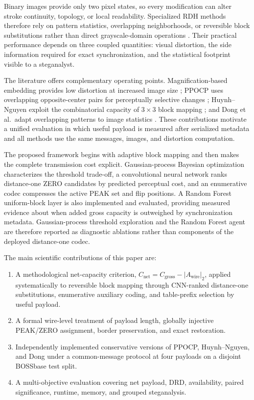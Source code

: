 \documentclass[a4paper,fleqn]{cas-dc}
\begin{document}
Binary images provide only two pixel states, so every modification can alter
stroke continuity, topology, or local readability. Specialized RDH methods
therefore rely on pattern statistics, overlapping neighborhoods, or reversible
block substitutions rather than direct grayscale-domain operations
\cite{Chhajed2023BlockDiagonal,Huynh2025BlockMapping,Yang2023Large,
Ren2022Sliding,Dong2020Adaptive,Zhang2022Magnification,Yin2020PPOCP,
23,Ren2019Encrypted,Feng2015Secure,69}. Their practical performance depends
on three coupled quantities: visual distortion, the side information required
for exact synchronization, and the statistical footprint visible to a
steganalyst.

The literature offers complementary operating points. Magnification-based
embedding provides low distortion at increased image size
\cite{Zhang2022Magnification}; PPOCP
uses overlapping opposite-center pairs for perceptually selective changes
\cite{Yin2020PPOCP}; Huynh--Nguyen exploit the combinatorial capacity of
$3\times3$ block mapping \cite{Huynh2025BlockMapping}; and Dong et al.\ adapt
overlapping patterns to image statistics \cite{Dong2020Adaptive}. These
contributions motivate a unified evaluation in
which useful payload is measured after serialized metadata and all methods use
the same messages, images, and distortion computation.

The proposed framework begins with adaptive block mapping and then makes the
complete transmission cost explicit. Gaussian-process Bayesian optimization
characterizes the threshold trade-off, a convolutional neural network ranks
distance-one ZERO candidates by predicted perceptual cost, and an enumerative
codec compresses the active PEAK set and flip positions. A Random Forest
uniform-block layer is also implemented and evaluated, providing measured
evidence about when added gross capacity is outweighed by synchronization
metadata. Gaussian-process threshold exploration and the Random Forest agent
are therefore reported as diagnostic ablations rather than components of the
deployed distance-one codec.

The main scientific contributions of this paper are:
\begin{enumerate}
    \item A methodological net-capacity criterion,
    $C_{\mathrm{net}}=C_{\mathrm{gross}}-|A_{\mathrm{wire}}|_2$, applied
    systematically to reversible block mapping through CNN-ranked
    distance-one substitutions, enumerative auxiliary coding, and table-prefix
    selection by useful payload.
    \item A formal wire-level treatment of payload length, globally injective
    PEAK/ZERO assignment, border preservation, and exact restoration.
    \item Independently implemented conservative versions of PPOCP,
    Huynh--Nguyen, and Dong under a common-message protocol at four payloads
    on a disjoint BOSSbase test split.
    \item A multi-objective evaluation covering net payload, DRD, availability,
    paired significance, runtime, memory, and grouped steganalysis.
\end{enumerate}
\end{document}
